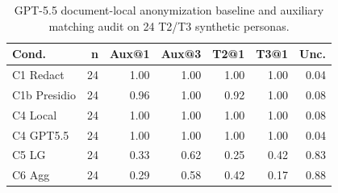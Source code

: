 \begin{table}[t]
\centering
\small
\setlength{\tabcolsep}{3pt}
\caption{GPT-5.5 document-local anonymization baseline and auxiliary matching audit on 24 T2/T3 synthetic personas.}
\label{tab:gpt55_doclocal_audit}
\begin{tabular}{lrrrrrr}
\toprule
Cond. & n & Aux@1 & Aux@3 & T2@1 & T3@1 & Unc. \\
\midrule
C1 Redact & 24 & 1.00 & 1.00 & 1.00 & 1.00 & 0.04 \\
C1b Presidio & 24 & 0.96 & 1.00 & 0.92 & 1.00 & 0.08 \\
C4 Local & 24 & 1.00 & 1.00 & 1.00 & 1.00 & 0.08 \\
C4 GPT5.5 & 24 & 1.00 & 1.00 & 1.00 & 1.00 & 0.04 \\
C5 LG & 24 & 0.33 & 0.62 & 0.25 & 0.42 & 0.83 \\
C6 Agg & 24 & 0.29 & 0.58 & 0.42 & 0.17 & 0.88 \\
\bottomrule
\end{tabular}
\end{table}
